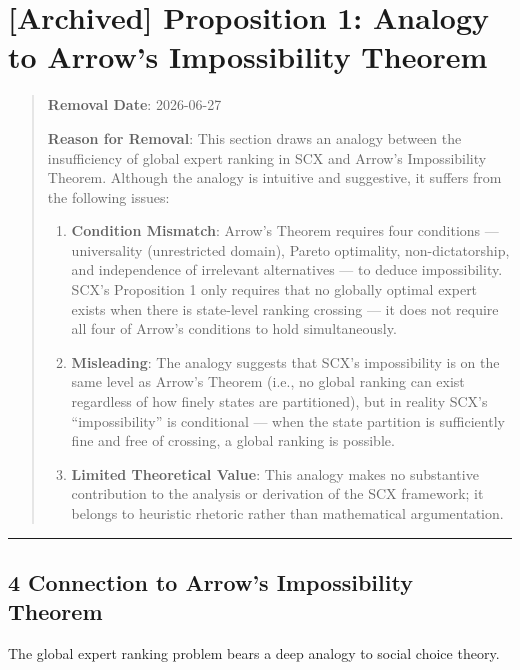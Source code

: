 \documentclass[
  12pt,
]{ctexart}
\author{SCX}
\date{2026}
\providecommand{\tightlist}{%
  \setlength{\itemsep}{0pt}\setlength{\parskip}{0pt}}
\begin{document}
\section{{[}Archived{]} Proposition 1: Analogy to Arrow's
Impossibility Theorem}\label{archived-proposition-1-analogy}

\begin{quote}
\textbf{Removal Date}: 2026-06-27

\textbf{Reason for Removal}: This section draws an analogy between the insufficiency of global expert ranking in SCX and Arrow's Impossibility Theorem. Although the analogy is intuitive and suggestive, it suffers from the following issues:

\begin{enumerate}
\def\labelenumi{\arabic{enumi}.}
\tightlist
\item
  \textbf{Condition Mismatch}: Arrow's Theorem requires four conditions --- universality (unrestricted domain), Pareto optimality, non-dictatorship, and independence of irrelevant alternatives --- to deduce impossibility. SCX's Proposition 1 only requires that no globally optimal expert exists when there is state-level ranking crossing --- it does not require all four of Arrow's conditions to hold simultaneously.
\item
  \textbf{Misleading}: The analogy suggests that SCX's impossibility is on the same level as Arrow's Theorem (i.e., no global ranking can exist regardless of how finely states are partitioned), but in reality SCX's ``impossibility'' is conditional --- when the state partition is sufficiently fine and free of crossing, a global ranking is possible.
\item
  \textbf{Limited Theoretical Value}: This analogy makes no substantive contribution to the analysis or derivation of the SCX framework; it belongs to heuristic rhetoric rather than mathematical argumentation.
\end{enumerate}
\end{quote}

\begin{center}\rule{0.5\linewidth}{0.5pt}\end{center}

\subsection{4 Connection to Arrow's Impossibility
Theorem}\label{connection-to-arrows-impossibility-theorem}

The global expert ranking problem bears a deep analogy to social choice theory.
\end{document}

